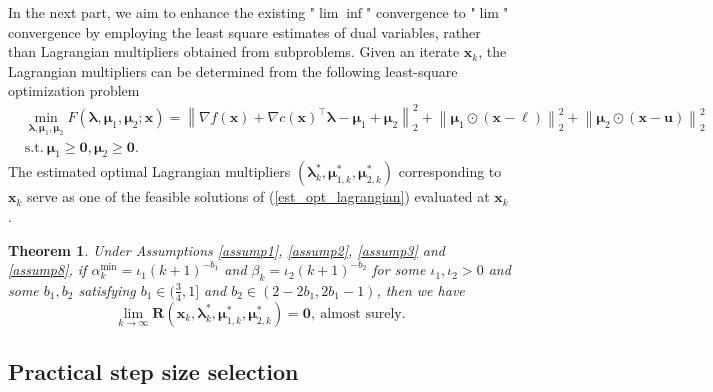 \documentclass[aos]{imsart}
\numberwithin{equation}{section}
\theoremstyle{plain}
\newtheorem{theorem}{Theorem}
\begin{document}
In the next part, we aim to enhance the existing "$\lim \inf$" convergence to "$\lim$" convergence by employing the least square estimates of dual variables, rather than Lagrangian multipliers obtained from subproblems. Given an iterate $\bm{x}_k$, the Lagrangian multipliers can be determined from the following least-square optimization problem
\begin{equation}
\label{est_opt_lagrangian}
\begin{split}
    & \min_{\bm{\lambda}, \bm{\mu}_{1}, \bm{\mu}_{2}} F(\bm{\lambda}, \bm{\mu}_{1}, \bm{\mu}_2; \bm{x}) =  \left\| \nabla f(\bm{x}) + \nabla c(\bm{x})^{\top} \bm{\lambda} - \bm{\mu}_{1} + \bm{\mu}_2 \right\|_2^2 + \left\| \bm{\mu}_{1} \odot \left( \bm{x} - \bm{\ell} \right) \right\|_2^2 + \left\| \bm{\mu}_{2} \odot \left( \bm{x} - \bm{u} \right) \right\|_2^2 \\
    & \text{s.t.}~ \bm{\mu}_{1} \geq \bm{0}, \bm{\mu}_2 \geq \bm{0}.
\end{split}
\end{equation}
The estimated optimal Lagrangian multipliers   $(\bm{\lambda}_{k}^{*}, \bm{\mu}_{1,k}^{*}, \bm{\mu}_{2,k}^{*})$ corresponding to $\bm{x}_k$ serve as one of the feasible solutions of (\ref{est_opt_lagrangian}) evaluated at $\bm{x}_k$.

\begin{theorem}\label{theorem_lim}
    Under Assumptions \ref{assump1}, \ref{assump2}, \ref{assump3} and \ref{assump8}, if $\alpha_k^{\text{min}} = \iota_1 (k+1)^{-b_1}$ and $\beta_k = \iota_2 (k+1)^{-b_2}$ for some $\iota_1, \iota_2 >0$ and some $b_1, b_2$ satisfying $b_1 \in (\frac{3}{4},1]$ and $b_2 \in \left( 2-2b_1,2b_1-1\right)$, then we have
     \begin{equation}
        \lim_{k \to \infty} \bm{R}(\bm{x}_{k},\bm{\lambda}_{k}^{*},\bm{\mu}_{1,k}^{*},\bm{\mu}_{2,k}^{*}) = \bm{0},~\text{almost surely}.
\end{equation}
    
\end{theorem}


\subsection{Practical step size selection}
\end{document}
